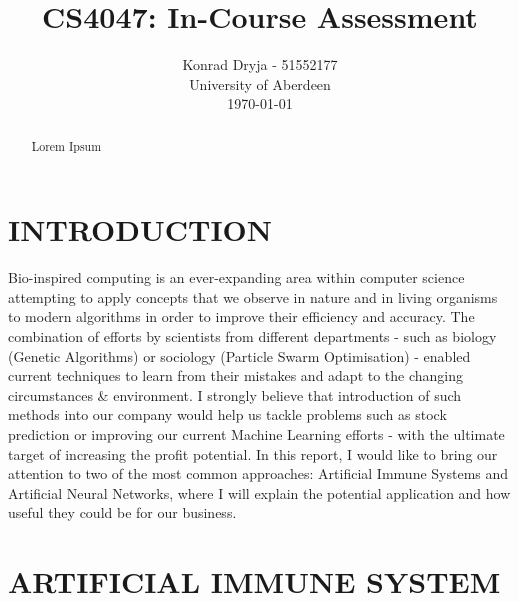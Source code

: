 \documentclass[letterpaper, 10 pt, conference]{ieeeconf}  %
\title{\LARGE \bf
CS4047: In-Course Assessment
}
\author{Konrad Dryja - 51552177 \\
  University of Aberdeen \\
  \today%
}
\begin{document}
\maketitle
\thispagestyle{empty}
\pagestyle{empty}


\begin{abstract}

Lorem Ipsum

\end{abstract}


\section{INTRODUCTION}

Bio-inspired computing is an ever-expanding area within computer science attempting to apply concepts that we observe in nature and in living organisms to modern algorithms in order to improve their efficiency and accuracy. The combination of efforts by scientists from different departments - such as biology (Genetic Algorithms) or sociology (Particle Swarm Optimisation) - enabled current techniques to learn from their mistakes and adapt to the changing circumstances \& environment. I strongly believe that introduction of such methods into our company would help us tackle problems such as stock prediction \cite{gunasekaran2011evaluation} or improving our current Machine Learning efforts - with the ultimate target of increasing the profit potential. In this report, I would like to bring our attention to two of the most common approaches: Artificial Immune Systems and Artificial Neural Networks, where I will explain the potential application and how useful they could be for our business.

\section{ARTIFICIAL IMMUNE SYSTEM}
\end{document}
